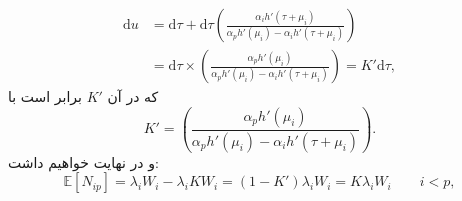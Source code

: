 \begin{align}
\mathrm{d}u&=\mathrm{d}\tau+\mathrm{d}\tau \left(\frac{\alpha_i h'(\tau+\mu_i)}{\alpha_p h'(\mu_i)-\alpha_i h'(\tau+\mu_i)}\right) \nonumber\\
&= \mathrm{d}\tau \times \left(\frac{\alpha_p h'(\mu_i)}{\alpha_p h'(\mu_i)-\alpha_i h'(\tau+\mu_i)}\right) = K' \mathrm{d}\tau,
\label{eq:jdkonggmd}
\end{align}
که در آن 
$K'$
برابر است با 
\begin{equation}
K' = \left(\frac{\alpha_p h'(\mu_i)}{\alpha_p h'(\mu_i)-\alpha_i h'(\tau+\mu_i)}\right).
\label{eq:Kconstant}
\end{equation}
و در نهایت خواهیم داشت:
\begin{equation}
\mathbb{E}[N_{ip}] = \lambda_{i} W_{i}- \lambda_{i}KW_{i} = (1-K')  \lambda_{i} W_{i} = K \lambda_{i} W_{i} \quad\quad  i< p,
\label{Eq:NEWlambda}
\end{equation}
